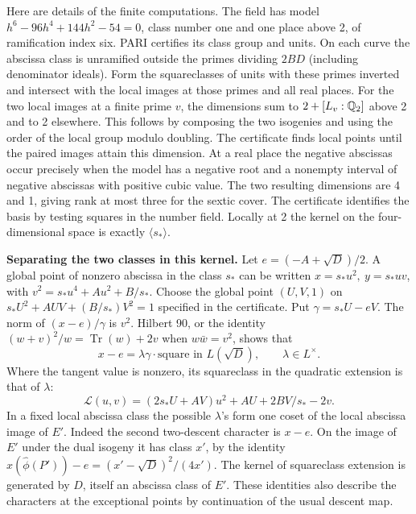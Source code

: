 Here are details of the finite computations. The field has model
\(h^6-96h^4+144h^2-54=0\), class number one and one place above 2,
of ramification index six. PARI certifies its class group and units.
On each curve the abscissa class is unramified outside the primes
dividing \(2BD\) (including denominator ideals). Form the squareclasses
of units with these primes inverted and intersect with the local
images at those primes and all real places. For the two local images
at a finite prime \(v\), the dimensions sum to
\(2+[L_v:\mathbb Q_2]\) above 2 and to 2 elsewhere. This follows by
composing the two isogenies and using the order of the local group
modulo doubling. The certificate finds local points until the paired
images attain this dimension. At a real place the negative abscissas
occur precisely when the model has a negative root and a nonempty
interval of negative abscissas with positive cubic value. The two
resulting dimensions are 4 and 1, giving rank at most three for the sextic cover. The certificate identifies the basis
by testing squares in the number field. Locally at 2 the kernel on
the four-dimensional space is exactly \(\langle s_*\rangle\).

\textbf{Separating the two classes in this kernel.} Let
\(e=(-A+\sqrt D)/2\). A global point of nonzero abscissa in the
class \(s_*\) can be written \(x=s_*u^2,\ y=s_*uv\), with
\(v^2=s_*u^4+A u^2+B/s_*\). Choose the global point \((U,V,1)\)
on \(s_*U^2+AUV+(B/s_*)V^2=1\) specified in the certificate.
Put \(\gamma=s_*U-eV\). The norm of \((x-e)/\gamma\) is \(v^2\).
Hilbert 90, or the identity \((w+v)^2/w=\operatorname{Tr}(w)+2v\)
when \(w\bar w=v^2\), shows that
\[x-e=\lambda\gamma\cdot\text{square in }L(\sqrt D),
 \qquad \lambda\in L^\times .\]
Where the tangent value is nonzero, its squareclass in the quadratic
extension is that of \(\lambda\):
\[\mathcal L(u,v)=(2s_*U+AV)u^2+AU+2BV/s_*-2v.\]
In a fixed local abscissa class the possible \(\lambda\)'s form one
coset of the local abscissa image of \(E'\). Indeed the second
two-descent character is \(x-e\). On the image of \(E'\) under the
dual isogeny it has class \(x'\), by the identity
\(x(\widehat\phi(P'))-e=(x'-\sqrt D)^2/(4x')\).
The kernel of squareclass extension is generated by \(D\), itself an
abscissa class of \(E'\). These identities also describe the characters
at the exceptional points by continuation of the usual descent map.

